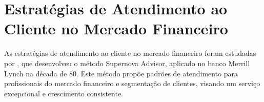 \section{Estratégias de Atendimento ao Cliente no Mercado Financeiro}

As estratégias de atendimento ao cliente no mercado financeiro foram estudadas por \cite{knapp2007}, que desenvolveu o método Supernova Advisor, aplicado no banco Merrill Lynch na década de 80. Este método propõe padrões de atendimento para profissionais do mercado financeiro e segmentação de clientes, visando um serviço excepcional e crescimento consistente.
